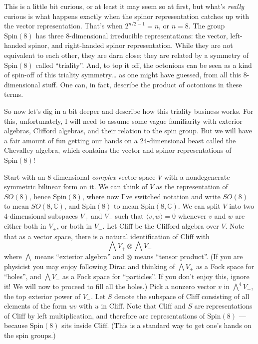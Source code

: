 \documentclass{article}
\begin{document}
This is a little bit curious, or at least it may seem so at first, but
what's \emph{really} curious is what happens exactly when the spinor
representation catches up with the vector representation. That's when
\(2^{n/2-1} = n\), or \(n = 8\). The group \(\mathrm{Spin}(8)\) has
three 8-dimensional irreducible representations: the vector, left-handed
spinor, and right-handed spinor representation. While they are not
equivalent to each other, they are darn close; they are related by a
symmetry of \(\mathrm{Spin}(8)\) called ``triality''. And, to top it
off, the octonions can be seen as a kind of spin-off of this triality
symmetry\ldots{} as one might have guessed, from all this 8-dimensional
stuff. One can, in fact, describe the product of octonions in these
terms.

So now let's dig in a bit deeper and describe how this triality business
works. For this, unfortunately, I will need to assume some vague
familiarity with exterior algebras, Clifford algebras, and their
relation to the spin group. But we will have a fair amount of fun
getting our hands on a 24-dimensional beast called the Chevalley
algebra, which contains the vector and spinor representations of
\(\mathrm{Spin}(8)\)!

Start with an 8-dimensional \emph{complex} vector space \(V\) with a
nondegenerate symmetric bilinear form on it. We can think of \(V\) as
the representation of \(SO(8)\), hence \(\mathrm{Spin}(8)\), where now
I've switched notation and write \(SO(8)\) to mean \(SO(8,\mathbb{C})\),
and \(\mathrm{Spin}(8)\) to mean \(\mathrm{Spin}(8,\mathbb{C})\). We can
split \(V\) into two 4-dimensional subspaces \(V_+\) and \(V_-\) such
that \(\langle v,w\rangle = 0\) whenever \(v\) and \(w\) are either both
in \(V_+\), or both in \(V_-\). Let \(\mathrm{Cliff}\) be the Clifford
algebra over \(V\). Note that as a vector space, there is a natural
identification of \(\mathrm{Cliff}\) with
\[\bigwedge V_+ \otimes \bigwedge V_-\] where \(\bigwedge\) means
``exterior algebra'' and \(\otimes\) means ``tensor product''. (If you
are physicist you may enjoy following Dirac and thinking of
\(\bigwedge V_+\) as a Fock space for ``holes'', and \(\bigwedge V_-\)
as a Fock space for ``particles''. If you don't enjoy this, ignore it!
We will now to proceed to fill all the holes.) Pick a nonzero vector
\(v\) in \(\bigwedge^4 V_-\), the top exterior power of \(V_-\). Let
\(S\) denote the subspace of \(\mathrm{Cliff}\) consisting of all
elements of the form \(uv\) with \(u\) in \(\mathrm{Cliff}\). Note that
\(\mathrm{Cliff}\) and \(S\) are representations of \(\mathrm{Cliff}\)
by left multiplication, and therefore are representations of
\(\mathrm{Spin}(8)\) --- because \(\mathrm{Spin}(8)\) sits inside
\(\mathrm{Cliff}\). (This is a standard way to get one's hands on the spin
groups.)
\end{document}
